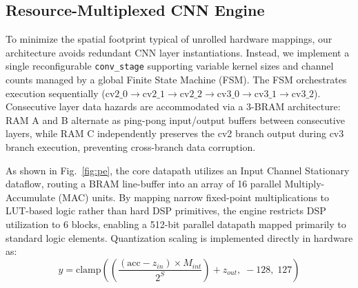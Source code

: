 \documentclass{svproc}
\begin{document}
\subsection{Resource-Multiplexed CNN Engine}
To minimize the spatial footprint typical of unrolled hardware mappings, our architecture avoids redundant CNN layer instantiations. Instead, we implement a single reconfigurable \texttt{conv\_stage} supporting variable kernel sizes and channel counts managed by a global Finite State Machine (FSM). The FSM orchestrates execution sequentially ($\text{cv2\_0} \to \text{cv2\_1} \to \text{cv2\_2} \to \text{cv3\_0} \to \text{cv3\_1} \to \text{cv3\_2}$). Consecutive layer data hazards are accommodated via a 3-BRAM architecture: RAM A and B alternate as ping-pong input/output buffers between consecutive layers, while RAM C independently preserves the cv2 branch output during cv3 branch execution, preventing cross-branch data corruption.

As shown in Fig.~\ref{fig:pe}, the core datapath utilizes an Input Channel Stationary dataflow, routing a BRAM line-buffer into an array of 16 parallel Multiply-Accumulate (MAC) units. By mapping narrow fixed-point multiplications to LUT-based logic rather than hard DSP primitives, the engine restricts DSP utilization to 6 blocks, enabling a 512-bit parallel datapath mapped primarily to standard logic elements. Quantization scaling is implemented directly in hardware as:
\begin{equation}
    y = \text{clamp}\!\left(\!\left(\frac{(\text{acc} - z_{in}) \times M_{int}}{2^{S}}\right) + z_{out},\; -128,\; 127\right)
\end{equation}
\end{document}
